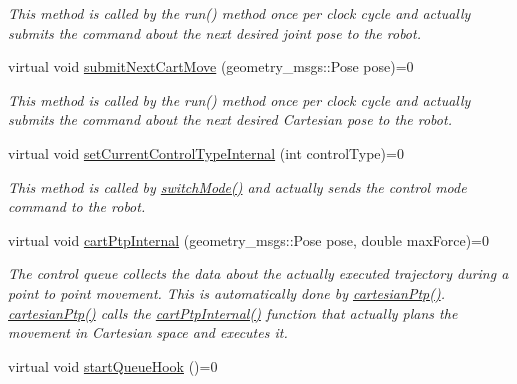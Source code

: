 \begin{DoxyCompactItemize}
\begin{DoxyCompactList}\small\item\em This method is called by the run() method once per clock cycle and actually submits the command about the next desired joint pose to the robot. \end{DoxyCompactList}\item 
virtual void \hyperlink{classkukadu_1_1ControlQueue_a910db788a6da11006d358a84197bff23}{submit\+Next\+Cart\+Move} (geometry\+\_\+msgs\+::\+Pose pose)=0\hypertarget{classkukadu_1_1ControlQueue_a910db788a6da11006d358a84197bff23}{}\label{classkukadu_1_1ControlQueue_a910db788a6da11006d358a84197bff23}

\begin{DoxyCompactList}\small\item\em This method is called by the run() method once per clock cycle and actually submits the command about the next desired Cartesian pose to the robot. \end{DoxyCompactList}\item 
virtual void \hyperlink{classkukadu_1_1ControlQueue_a76e7bf30b8e694c0db9bec92e06529a0}{set\+Current\+Control\+Type\+Internal} (int control\+Type)=0\hypertarget{classkukadu_1_1ControlQueue_a76e7bf30b8e694c0db9bec92e06529a0}{}\label{classkukadu_1_1ControlQueue_a76e7bf30b8e694c0db9bec92e06529a0}

\begin{DoxyCompactList}\small\item\em This method is called by \hyperlink{classkukadu_1_1ControlQueue_a5defe63d9f1b9829676f9a31a4683911}{switch\+Mode()} and actually sends the control mode command to the robot. \end{DoxyCompactList}\item 
virtual void \hyperlink{classkukadu_1_1ControlQueue_a13059c37abe4846a356e0cfcf10958b9}{cart\+Ptp\+Internal} (geometry\+\_\+msgs\+::\+Pose pose, double max\+Force)=0\hypertarget{classkukadu_1_1ControlQueue_a13059c37abe4846a356e0cfcf10958b9}{}\label{classkukadu_1_1ControlQueue_a13059c37abe4846a356e0cfcf10958b9}

\begin{DoxyCompactList}\small\item\em The control queue collects the data about the actually executed trajectory during a point to point movement. This is automatically done by \hyperlink{classkukadu_1_1ControlQueue_a1bfa23a8ce6319f6ef0ed9208e896054}{cartesian\+Ptp()}. \hyperlink{classkukadu_1_1ControlQueue_a1bfa23a8ce6319f6ef0ed9208e896054}{cartesian\+Ptp()} calls the \hyperlink{classkukadu_1_1ControlQueue_a13059c37abe4846a356e0cfcf10958b9}{cart\+Ptp\+Internal()} function that actually plans the movement in Cartesian space and executes it. \end{DoxyCompactList}\item 
virtual void \hyperlink{classkukadu_1_1ControlQueue_a87d7c2d918d0ca720eeae609959d4d78}{start\+Queue\+Hook} ()=0\hypertarget{classkukadu_1_1ControlQueue_a87d7c2d918d0ca720eeae609959d4d78}{}\label{classkukadu_1_1ControlQueue_a87d7c2d918d0ca720eeae609959d4d78}


\end{DoxyCompactItemize}
